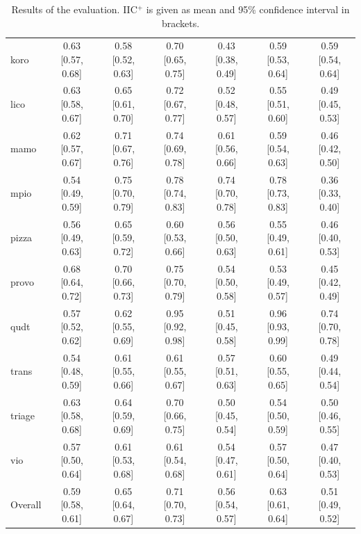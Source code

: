 \begin{table}[ht]
\begin{widepage}
\begin{tabular}{|l|cccccc|}
      koro & 0.63 [0.57, 0.68] & 0.58 [0.52, 0.63] & 0.70 [0.65, 0.75] & 0.43 [0.38, 0.49] & 0.59 [0.53, 0.64] & 0.59 [0.54, 0.64] \\
      lico & 0.63 [0.58, 0.67] & 0.65 [0.61, 0.70] & 0.72 [0.67, 0.77] & 0.52 [0.48, 0.57] & 0.55 [0.51, 0.60] & 0.49 [0.45, 0.53] \\
      mamo & 0.62 [0.57, 0.67] & 0.71 [0.67, 0.76] & 0.74 [0.69, 0.78] & 0.61 [0.56, 0.66] & 0.59 [0.54, 0.63] & 0.46 [0.42, 0.50] \\
      mpio & 0.54 [0.49, 0.59] & 0.75 [0.70, 0.79] & 0.78 [0.74, 0.83] & 0.74 [0.70, 0.78] & 0.78 [0.73, 0.83] & 0.36 [0.33, 0.40] \\
      pizza & 0.56 [0.49, 0.63] & 0.65 [0.59, 0.72] & 0.60 [0.53, 0.66] & 0.56 [0.50, 0.63] & 0.55 [0.49, 0.61] & 0.46 [0.40, 0.53] \\
      provo & 0.68 [0.64, 0.72] & 0.70 [0.66, 0.73] & 0.75 [0.70, 0.79] & 0.54 [0.50, 0.58] & 0.53 [0.49, 0.57] & 0.45 [0.42, 0.49] \\
      qudt & 0.57 [0.52, 0.62] & 0.62 [0.55, 0.69] & 0.95 [0.92, 0.98] & 0.51 [0.45, 0.58] & 0.96 [0.93, 0.99] & 0.74 [0.70, 0.78] \\
      trans & 0.54 [0.48, 0.59] & 0.61 [0.55, 0.66] & 0.61 [0.55, 0.67] & 0.57 [0.51, 0.63] & 0.60 [0.55, 0.65] & 0.49 [0.44, 0.54] \\
      triage & 0.63 [0.58, 0.68] & 0.64 [0.59, 0.69] & 0.70 [0.66, 0.75] & 0.50 [0.45, 0.54] & 0.54 [0.50, 0.59] & 0.50 [0.46, 0.55] \\
      vio & 0.57 [0.50, 0.64] & 0.61 [0.53, 0.68] & 0.61 [0.54, 0.68] & 0.54 [0.47, 0.61] & 0.57 [0.50, 0.64] & 0.47 [0.40, 0.53] \\
      \hline
      Overall & 0.59 [0.58, 0.61] & 0.65 [0.64, 0.67] & 0.71 [0.70, 0.73] & 0.56 [0.54, 0.57] & 0.63 [0.61, 0.64] & 0.51 [0.49, 0.52] \\
      \hline
    \end{tabular}
  \end{widepage}
  \caption{Results of the evaluation. IIC$^+$ is given as mean and 95\% confidence interval in brackets.}
\end{table}


